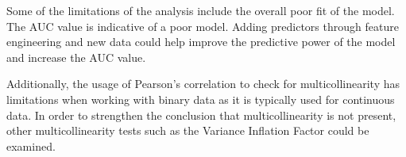 \documentclass[
]{article}
\begin{document}
Some of the limitations of the analysis include the overall poor fit of
the model. The AUC value is indicative of a poor model. Adding
predictors through feature engineering and new data could help improve
the predictive power of the model and increase the AUC value.

Additionally, the usage of Pearson's correlation to check for
multicollinearity has limitations when working with binary data as it is
typically used for continuous data. In order to strengthen the
conclusion that multicollinearity is not present, other
multicollinearity tests such as the Variance Inflation Factor could be
examined.
\end{document}
